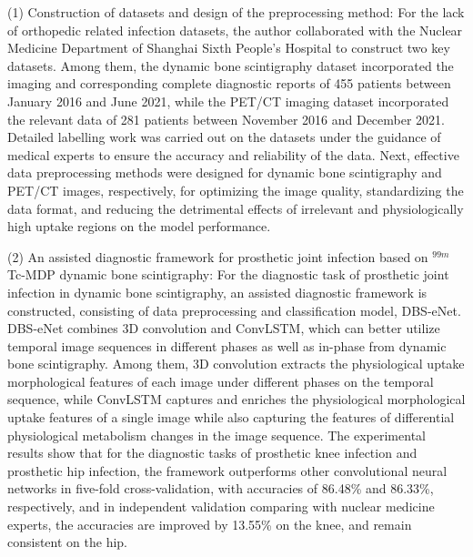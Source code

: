 \begin{eabstract}
    (1) Construction of datasets and design of the preprocessing method: For the lack of orthopedic related infection datasets, the author collaborated with the Nuclear Medicine Department of Shanghai Sixth People's Hospital to construct two key datasets. Among them, the dynamic bone scintigraphy dataset incorporated the imaging and corresponding complete diagnostic reports of 455 patients between January 2016 and June 2021, while the PET/CT imaging dataset incorporated the relevant data of 281 patients between November 2016 and December 2021. Detailed labelling work was carried out on the datasets under the guidance of medical experts to ensure the accuracy and reliability of the data. Next, effective data preprocessing methods were designed for dynamic bone scintigraphy and PET/CT images, respectively, for optimizing the image quality, standardizing the data format, and reducing the detrimental effects of irrelevant and physiologically high uptake regions on the model performance.

    (2) An assisted diagnostic framework for prosthetic joint infection based on \(^{99m}\)Tc-MDP dynamic bone scintigraphy: For the diagnostic task of prosthetic joint infection in dynamic bone scintigraphy, an assisted diagnostic framework is constructed, consisting of data preprocessing and classification model, DBS-eNet. DBS-eNet combines 3D convolution and ConvLSTM, which can better utilize temporal image sequences in different phases as well as in-phase from dynamic bone scintigraphy. Among them, 3D convolution extracts the physiological uptake morphological features of each image under different phases on the temporal sequence, while ConvLSTM captures and enriches the physiological morphological uptake features of a single image while also capturing the features of differential physiological metabolism changes in the image sequence. The experimental results show that for the diagnostic tasks of prosthetic knee infection and prosthetic hip infection, the framework outperforms other convolutional neural networks in five-fold cross-validation, with accuracies of 86.48\% and 86.33\%, respectively, and in independent validation comparing with nuclear medicine experts, the accuracies are improved by 13.55\% on the knee, and remain consistent on the hip.


\end{eabstract}
